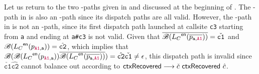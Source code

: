 Let us return to  the two \LFC-paths given in   and
 discussed at the beginning of .
The \LFC-path in  is also an \LFCR-path since its
dispatch paths are all valid. However, the \LFC-path  in 
is not an \LFCR-path, since
 its first dispatch path launched at callsite \texttt{c3} starting from 
\texttt{a} and ending at \texttt{a\#c3} is not valid. Given that
$\overline{{{\mbox{$\mathscr{B}(\mbox{${L}_C$}^\textsf{en}(\overline{p_{\texttt{a},{\color{purple}\texttt{A1}}
}}))$}}}}= \check{\texttt{c1}}$ and
${{\mbox{$\mathscr{B}(\mbox{${L}_C$}^\textsf{en}(p_{{\color{purple}\texttt{A1}},\texttt{a}})$}}}) = 
\hat{\texttt{c2}}$, which implies that
$\mbox{$\mathscr{B}({{\mbox{$\mathscr{B}(\mbox{${L}_C$}^\textsf{en}(p_{{\color{purple}\texttt{A1}},\texttt{a}})$}}}) 
\overline{{{\mbox{$\mathscr{B}(\mbox{${L}_C$}^\textsf{en}(\overline{p_{\texttt{a},{\color{purple}\texttt{A1}}
}}))$}}}})$}
= \hat{\texttt{c2}} \check{\texttt{c1}} 
\neq \epsilon$,
this dispatch path is
 invalid
since $\check{\texttt{c1}} 
\hat{\texttt{c2}} $  cannot balance out according to 
$\textsf{ctxRecovered} \longrightarrow \check{{c}} ~ \textsf{ctxRecovered} ~ \hat{{c}}$. 










